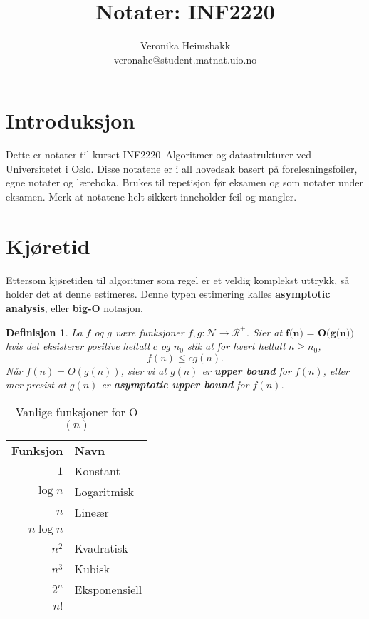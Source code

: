 \documentclass[11pt,a4paper]{article}
\title{Notater: INF2220}
\author{Veronika Heimsbakk \\ 
veronahe@student.matnat.uio.no}
\begin{document}
\maketitle{}
\tableofcontents
\newpage{}

\section*{Introduksjon}
Dette er notater til kurset INF2220--Algoritmer og datastrukturer ved Universitetet i Oslo. Disse notatene er i all hovedsak basert på forelesningsfoiler, egne notater og læreboka. Brukes til repetisjon før eksamen og som notater under eksamen. Merk at notatene helt sikkert inneholder feil og mangler.


\section{Kjøretid}
Ettersom kjøretiden til algoritmer som regel er et veldig komplekst uttrykk, så holder det at denne estimeres. Denne typen estimering kalles \textbf{asymptotic analysis}, eller \textbf{big-O} notasjon.

\theoremstyle{mytheoremstyle}
\newtheorem{onotasjon}{Definisjon}[section]
\begin{onotasjon}
La $f$ og $g$ være funksjoner $f,g: \mathcal{N} \rightarrow \mathcal{R}^+$. Sier at $\textbf{f(n) = O(g(n))}$ hvis det eksisterer positive heltall $c$ og $n_0$ slik at for hvert heltall $n \geq n_0$,
$$f(n) \leq c g(n).$$
Når $f(n) = O(g(n))$, sier vi at $g(n)$ er \textbf{upper bound} for $f(n)$, eller mer presist at $g(n)$ er \textbf{asymptotic upper bound} for $f(n)$.
\end{onotasjon}

\begin{table}[h!]
\centering
\begin{tabular}{rl}
\textbf{Funksjon}&\textbf{Navn}\\
$1$&Konstant\\
$\log n$&Logaritmisk\\
$n$&Lineær\\
$n \log n$&\\
$n^2$&Kvadratisk\\
$n^3$&Kubisk\\
$2^n$&Eksponensiell\\
$n!$&\\
\end{tabular}
\label{tab:ofunc}
\caption{Vanlige funksjoner for O$(n)$}
\end{table}
\end{document}
